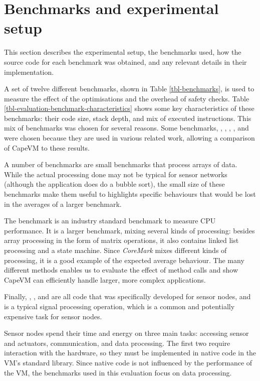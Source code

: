 \section{Benchmarks and experimental setup}
\label{sec-evaluation-benchmarks}

This section describes the experimental setup, the benchmarks used, how the source code for each benchmark was obtained, and any relevant details in their implementation.

A set of twelve different benchmarks, shown in Table \ref{tbl-benchmarks}, is used to measure the effect of the optimisations and the overhead of safety checks. Table \ref{tbl-evaluation-benchmark-characteristics} shows some key characteristics of these benchmarks: their code size, stack depth, and mix of executed instructions. This mix of benchmarks was chosen for several reasons. Some benchmarks, , , , , and  were chosen because they are used in various related work, allowing a comparison of CapeVM to these results.

A number of benchmarks are small benchmarks that process arrays of data. While the actual processing done may not be typical for sensor networks (although the  application does do a bubble sort), the small size of these benchmarks make them useful to highlights specific behaviours that would be lost in the averages of a larger benchmark.

The  benchmark is an industry standard benchmark to measure CPU performance. It is a larger benchmark, mixing several kinds of processing: besides array processing in the form of matrix operations, it also contains linked list processing and a state machine. Since \emph{CoreMark} mixes different kinds of processing, it is a good example of the expected average behaviour. The many different methods enables us to evaluate the effect of method calls and show CapeVM can efficiently handle larger, more complex applications.

Finally, , ,  and  are all code that was specifically developed for sensor nodes, and  is a typical signal processing operation, which is a common and potentially expensive task for sensor nodes.

Sensor nodes spend their time and energy on three main tasks: accessing sensor and actuators, communication, and data processing. The first two require interaction with the hardware, so they must be implemented in native code in the VM's standard library. Since native code is not influenced by the performance of the VM, the benchmarks used in this evaluation focus on data processing.

